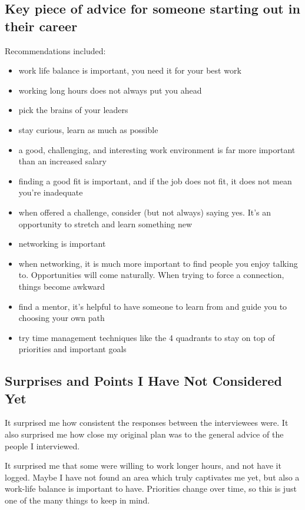 \subsection{Key piece of advice for someone starting out in their career}
Recommendations included:
\begin{singlespace}
  \begin{itemize}
      \item work life balance is important, you need it for your best work
      \item working long hours does not always put you ahead
      \item pick the brains of your leaders 
      \item stay curious, learn as much as possible
      \item a good, challenging, and interesting work environment is far more important than an increased salary
      \item finding a good fit is important, and if the job does not fit, it does not mean you're inadequate
      \item when offered a challenge, consider (but not always) saying yes. It's an opportunity to stretch and learn something new
      \item networking is important
      \item when networking, it is much more important to find people you enjoy talking to.
            Opportunities will come naturally. When trying to force a connection, things become awkward
      \item find a mentor, it's helpful to have someone to learn from and guide 
            you to choosing your own path
      \item try time management techniques like the 4 quadrants to stay on top
            of priorities and important goals
  \end{itemize}
\end{singlespace}

\subsection{Surprises and Points I Have Not Considered Yet}
It surprised me how consistent the responses between the interviewees were.
It also surprised me how close my original plan was to the general advice of
the people I interviewed. 

It surprised me that some were willing to work longer
hours, and not have it logged. Maybe I have not found an area which truly
captivates me yet, but also a work-life balance is important to have. Priorities
change over time, so this is just one of the many things to keep in mind.

